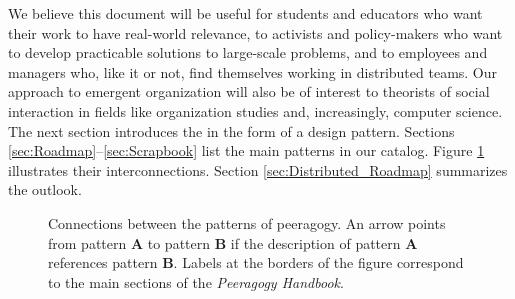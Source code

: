 We believe this document will be useful for students and educators who want their work to have real-world relevance, to activists and policy-makers who want to develop practicable solutions to large-scale problems, and to employees and managers who, like it or not, find themselves working in distributed teams.   Our approach to emergent organization will also be of interest to theorists of social interaction in fields like organization studies and, increasingly, computer science.  The next section introduces the  in the form of a design pattern.  Sections \ref{sec:Roadmap}--\ref{sec:Scrapbook} list the main patterns in our catalog.    Figure \ref{fig:connections} illustrates their interconnections.  Section \ref{sec:Distributed_Roadmap} summarizes the outlook.

\begin{figure}
\vspace{-.9in}
{\centering


\par
}
\vspace{-.9in}
\caption{Connections between the patterns of peeragogy.  An arrow points from pattern \textbf{A} to pattern \textbf{B} if the description of pattern \textbf{A} references pattern \textbf{B}. Labels at the borders of the figure correspond to the main sections of the \emph{Peeragogy Handbook}.\label{fig:connections}}
\end{figure}

